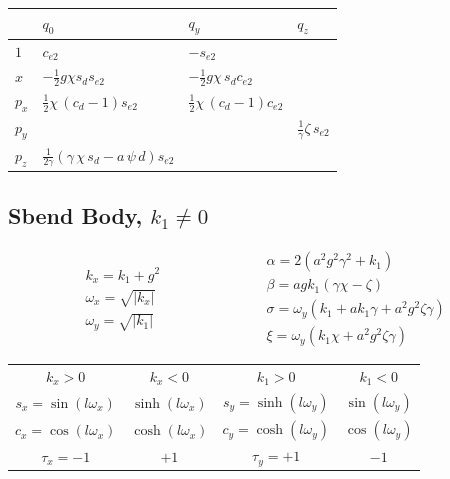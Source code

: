 \begin{center}
\begin{tabular}{llll} \toprule
        & $q_0$    & $q_y$     & $q_z$ \\ \midrule
  $1$   & $c_{e2}$ & $-s_{e2}$ &       \\ \addlinespace[1ex]
  $x$   & $-\frac{1}{2} g \chi s_{d} s_{e2}$ & $-\frac{1}{2} g \chi \, s_{d} c_{e2}$ & \\ \addlinespace[1ex]
  $p_x$ & $\frac{1}{2} \chi \, (c_{d} - 1)  s_{e2}$ & $\frac{1}{2} \chi \, (c_{d} - 1) c_{e2}$ & \\ \addlinespace[1ex]
  $p_y$ &          &           & $\frac{1}{\gamma} \zeta \, s_{e2}$ \\ \addlinespace[1ex]
  $p_z$ & $\frac{1}{2 \gamma} \left(\gamma \, \chi \, s_{d} -a \, \psi \, {d} \right) s_{e2}$ & & \\
  \bottomrule
\end{tabular}
\end{center}

\subsection{Sbend Body, $k_1 \neq 0$}

\begin{equation}
\begin{aligned}
  &  k_x = k_1 + g^2 \\
  & \omega_x = \sqrt{|k_x|} \\
  & \omega_y = \sqrt{|k_1|}
\end{aligned}
\qquad\qquad\qquad
\begin{aligned}
  & \alpha = 2(a^2 g^2 \gamma^2 + k_1) \\ \nonumber
  & \beta = a g k_1 (\gamma \chi - \zeta) \\ \nonumber
  & \sigma = \omega_y (k_1 + a k_1 \gamma + a^2g^2 \zeta \gamma)\\ \nonumber
  & \xi = \omega_y (k_1 \chi + a^2 g^2 \zeta \gamma) \nonumber
\end{aligned}
\end{equation}

\begin{center}
\begin{tabular}{cccc}
  $k_x > 0$                  & $k_x < 0$              & $k_1 > 0$                   & $k_1 < 0$  \\
  $s_x = \sin{(l \omega_x)}$ & $ \sinh{(l \omega_x)}$ & $s_y = \sinh{(l \omega_y)}$ & $ \sin{(l \omega_y)}$ \\
  $c_x = \cos{(l \omega_x)}$ & $ \cosh{(l \omega_x)}$ & $c_y = \cosh{(l \omega_y)}$ & $ \cos{(l \omega_y)}$ \\
  $\tau_x = -1$              & $+1$                   & $\tau_y = +1$               & $-1$
\end{tabular}
\end{center}

